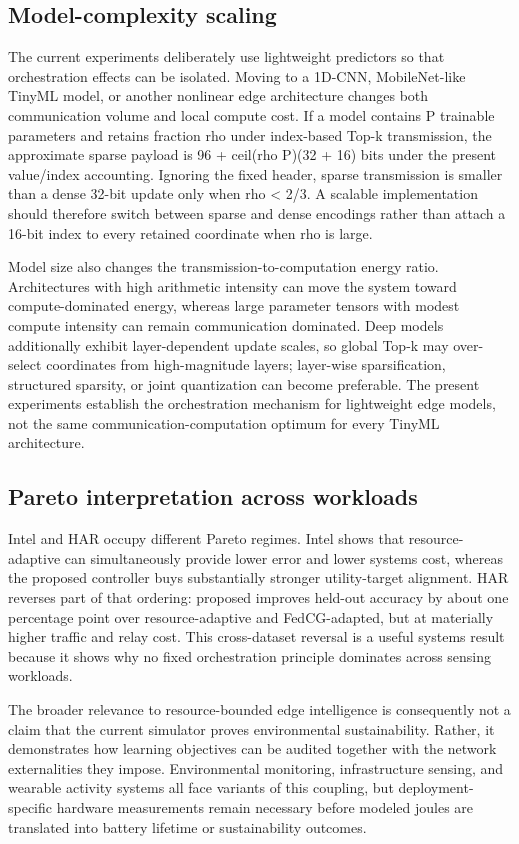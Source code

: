 \documentclass[11pt]{article}
\begin{document}
\subsection*{Model-complexity scaling}
The current experiments deliberately use lightweight predictors so that orchestration effects can be isolated. Moving to a 1D-CNN, MobileNet-like TinyML model, or another nonlinear edge architecture changes both communication volume and local compute cost. If a model contains P trainable parameters and retains fraction rho under index-based Top-k transmission, the approximate sparse payload is 96 + ceil(rho P)(32 + 16) bits under the present value/index accounting. Ignoring the fixed header, sparse transmission is smaller than a dense 32-bit update only when rho < 2/3. A scalable implementation should therefore switch between sparse and dense encodings rather than attach a 16-bit index to every retained coordinate when rho is large.\par
Model size also changes the transmission-to-computation energy ratio. Architectures with high arithmetic intensity can move the system toward compute-dominated energy, whereas large parameter tensors with modest compute intensity can remain communication dominated. Deep models additionally exhibit layer-dependent update scales, so global Top-k may over-select coordinates from high-magnitude layers; layer-wise sparsification, structured sparsity, or joint quantization can become preferable. The present experiments establish the orchestration mechanism for lightweight edge models, not the same communication-computation optimum for every TinyML architecture.\par
\subsection*{Pareto interpretation across workloads}
Intel and HAR occupy different Pareto regimes. Intel shows that resource-adaptive can simultaneously provide lower error and lower systems cost, whereas the proposed controller buys substantially stronger utility-target alignment. HAR reverses part of that ordering: proposed improves held-out accuracy by about one percentage point over resource-adaptive and FedCG-adapted, but at materially higher traffic and relay cost. This cross-dataset reversal is a useful systems result because it shows why no fixed orchestration principle dominates across sensing workloads.\par
The broader relevance to resource-bounded edge intelligence is consequently not a claim that the current simulator proves environmental sustainability. Rather, it demonstrates how learning objectives can be audited together with the network externalities they impose. Environmental monitoring, infrastructure sensing, and wearable activity systems all face variants of this coupling, but deployment-specific hardware measurements remain necessary before modeled joules are translated into battery lifetime or sustainability outcomes.\par
\end{document}
